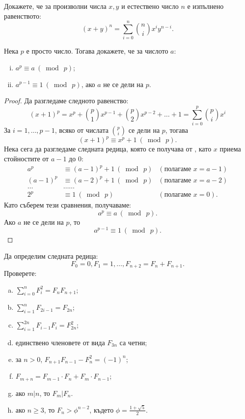\begin{problem}
  Докажете, че за произволни числа $x,y$ и естествено число $n$ е изпълнено равенството:
  \[(x+y)^n = \sum^{n}_{i=0}\binom{n}{i}x^iy^{n-i}.\]
\end{problem}
\begin{problem}
  Нека $p$ е просто число. Тогава докажете, че за числото $a$:
  \begin{enumerate}[i)]
  \item
    $a^p \equiv a\ (\bmod\ p)$;
  \item 
    $a^{p-1} \equiv 1\ (\bmod\ p)$, ако $a$ не се дели на $p$.
  \end{enumerate}
\end{problem}
\begin{proof}
  Да разгледаме следното равенство:
  \[(x+1)^p = x^p + \binom{p}{1}x^{p-1} + \binom{p}{2}x^{p-2} + \dots + 1 = \sum^{p}_{i=0}\binom{p}{i}x^i\]
  За $i = 1,\dots,p-1$, всяко от числата $\binom{p}{i}$ се дели на $p$, тогава
  \begin{equation}
    \label{eq:fermat}
    (x+1)^p \equiv x^p + 1\ (\bmod\ p).
  \end{equation}
  Нека сега да разгледаме следната редица, която се получава от , като $x$ приема стойностите от $a-1$ до $0$:
  \begin{align*}
    a^p & \equiv (a-1)^p+1\ (\bmod\ p) & (\text{полагаме }x = a-1)\\
    (a-1)^p & \equiv (a-2)^p+1\ (\bmod\ p) & (\text{полагаме }x = a-2)\\
    \dots & \dots\dots\\
    2^p & \equiv 1\ (\bmod\ p) & (\text{полагаме }x = 0).
  \end{align*}
  Като съберем тези сравнения, получаваме:
  \[a^p \equiv a\ (\bmod\ p).\]
  Ако $a$ не се дели на $p$, то
  \[a^{p-1} \equiv 1\ (\bmod\ p).\]
\end{proof}

\begin{problem}
  Да определим следната редица:
  \[F_0 = 0,F_1 = 1,\dots,F_{n+2} = F_{n} + F_{n+1}.\]
  Проверете:
  \begin{enumerate}[a)]
  \item
    $\sum^n_{i=0} F^2_i = F_{n}F_{n+1}$;
  \item
    $\sum^n_{i=1} F_{2i-1} = F_{2n}$;
  \item
    $\sum^{2n}_{i=1}F_{i-1}F_{i} = F^2_{2n}$;
  \item
    единствено членовете от вида $F_{3n}$ са четни;
  \item
    за $n > 0$, $F_{n+1}F_{n-1} - F^2_n = (-1)^n$;
  \item
    $F_{m+n} = F_{m-1}\cdot F_{n} + F_m \cdot F_{n-1}$;
  \item
    ако $m\vert n$, то $F_m \vert F_n$.
  \item
    ако $n\geq 3$, то $F_n > \phi^{n-2}$,
    където $\phi = \frac{1+\sqrt{5}}{2}$.
  \end{enumerate}
\end{problem}


